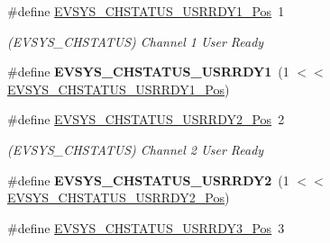 \begin{DoxyCompactItemize}
\item 
\hypertarget{group___s_a_m_l21___e_v_s_y_s_gaa2f0f962a05eee1cba8f91c5daf31918}{}\#define \hyperlink{group___s_a_m_l21___e_v_s_y_s_gaa2f0f962a05eee1cba8f91c5daf31918}{E\+V\+S\+Y\+S\+\_\+\+C\+H\+S\+T\+A\+T\+U\+S\+\_\+\+U\+S\+R\+R\+D\+Y1\+\_\+\+Pos}~1\label{group___s_a_m_l21___e_v_s_y_s_gaa2f0f962a05eee1cba8f91c5daf31918}

\begin{DoxyCompactList}\small\item\em (E\+V\+S\+Y\+S\+\_\+\+C\+H\+S\+T\+A\+T\+U\+S) Channel 1 User Ready \end{DoxyCompactList}\item 
\hypertarget{group___s_a_m_l21___e_v_s_y_s_ga160be8db199aa8d01be81aec0b945388}{}\#define {\bfseries E\+V\+S\+Y\+S\+\_\+\+C\+H\+S\+T\+A\+T\+U\+S\+\_\+\+U\+S\+R\+R\+D\+Y1}~(1 $<$$<$ \hyperlink{group___s_a_m_l21___e_v_s_y_s_gaa2f0f962a05eee1cba8f91c5daf31918}{E\+V\+S\+Y\+S\+\_\+\+C\+H\+S\+T\+A\+T\+U\+S\+\_\+\+U\+S\+R\+R\+D\+Y1\+\_\+\+Pos})\label{group___s_a_m_l21___e_v_s_y_s_ga160be8db199aa8d01be81aec0b945388}

\item 
\hypertarget{group___s_a_m_l21___e_v_s_y_s_gabbc0d5260a39f05dce0b925cb0de5341}{}\#define \hyperlink{group___s_a_m_l21___e_v_s_y_s_gabbc0d5260a39f05dce0b925cb0de5341}{E\+V\+S\+Y\+S\+\_\+\+C\+H\+S\+T\+A\+T\+U\+S\+\_\+\+U\+S\+R\+R\+D\+Y2\+\_\+\+Pos}~2\label{group___s_a_m_l21___e_v_s_y_s_gabbc0d5260a39f05dce0b925cb0de5341}

\begin{DoxyCompactList}\small\item\em (E\+V\+S\+Y\+S\+\_\+\+C\+H\+S\+T\+A\+T\+U\+S) Channel 2 User Ready \end{DoxyCompactList}\item 
\hypertarget{group___s_a_m_l21___e_v_s_y_s_gadf01ad55dda5a1051f6b727ddf8febb3}{}\#define {\bfseries E\+V\+S\+Y\+S\+\_\+\+C\+H\+S\+T\+A\+T\+U\+S\+\_\+\+U\+S\+R\+R\+D\+Y2}~(1 $<$$<$ \hyperlink{group___s_a_m_l21___e_v_s_y_s_gabbc0d5260a39f05dce0b925cb0de5341}{E\+V\+S\+Y\+S\+\_\+\+C\+H\+S\+T\+A\+T\+U\+S\+\_\+\+U\+S\+R\+R\+D\+Y2\+\_\+\+Pos})\label{group___s_a_m_l21___e_v_s_y_s_gadf01ad55dda5a1051f6b727ddf8febb3}

\item 
\hypertarget{group___s_a_m_l21___e_v_s_y_s_gaadc4166c437dd04d3bbebda33e9c1b0e}{}\#define \hyperlink{group___s_a_m_l21___e_v_s_y_s_gaadc4166c437dd04d3bbebda33e9c1b0e}{E\+V\+S\+Y\+S\+\_\+\+C\+H\+S\+T\+A\+T\+U\+S\+\_\+\+U\+S\+R\+R\+D\+Y3\+\_\+\+Pos}~3\label{group___s_a_m_l21___e_v_s_y_s_gaadc4166c437dd04d3bbebda33e9c1b0e}


\end{DoxyCompactItemize}
